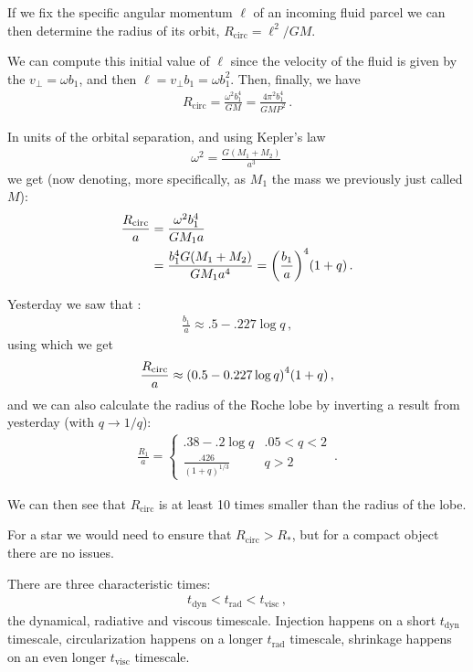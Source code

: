 \documentclass[main.tex]{subfiles}
\begin{document}
If we fix the specific angular momentum \(\ell\) of an incoming fluid parcel we can then determine the radius of its orbit, \(R _{\text{circ}} = \ell^2 / GM\). 

We can compute this initial value of \(\ell\) since the velocity of the fluid is given by the \(v_{\perp} = \omega b_1 \), and then \(\ell = v_\perp b_1 = \omega b_1^2\). 
Then, finally, we have 
%
\begin{align}
R _{\text{circ}} = \frac{\omega^2 b_1^{4}}{GM} = \frac{4 \pi^2 b_1^{4}}{GM P^2}
\,.
\end{align}

In units of the orbital separation, and using Kepler's law 
%
\begin{align}
\omega^2 = \frac{G (M_1 + M_2 )}{a^3}
\,
\end{align}
%
we get (now denoting, more specifically, as \(M_1 \) the mass we previously just called \(M\)):
%
\begin{align}
\frac{R _{\text{circ}}}{a} &= \frac{\omega^2 b_1^{4}}{GM_1  a}  \\
&= \frac{b_1^{4} G (M_1 + M_2 )}{GM_1 a^{4}} = \qty(\frac{b_1 }{a})^{4} (1 + q)
\,.
\end{align}

Yesterday we saw that \cite[]{frankAccretionPowerAstrophysics2002}:
%
\begin{align}
\frac{b_1 }{a} \approx \num{.5} - \num{.227} \log q
\,,
\end{align}
%
using which we get 
%
\begin{align}
\frac{R _{\text{circ}}}{a} \approx \qty(\num{.5} - \num{.227} \log q)^{4} (1+q)
\,,
\end{align}
%
and we can also calculate the radius of the Roche lobe by inverting a result from yesterday (with \(q \to 1/q\)): 
%
\begin{align}
\frac{R_1}{a} = \begin{cases}
    \num{.38} -\num{.2} \log q & \num{.05} < q < 2 \\
    \frac{\num{.426}}{(1 + q)^{1/3}} & q > 2
\end{cases}
\,.
\end{align}

We can then see that \(R _{\text{circ}}\) is at least 10 times smaller than the radius of the lobe.

For a star we would need to ensure that \(R _{\text{circ}} > R_{*}\), but for a compact object there are no issues.

There are three characteristic times: 
%
\begin{align}
t _{\text{dyn}} < t _{\text{rad}} < t _{\text{visc}}
\,,
\end{align}
%
the dynamical, radiative and viscous timescale. Injection happens on a short \(t _{\text{dyn}}\) timescale, circularization happens on a longer \(t _{\text{rad}}\) timescale, shrinkage happens on an even longer \(t _{\text{visc}}\) timescale.
\end{document}
